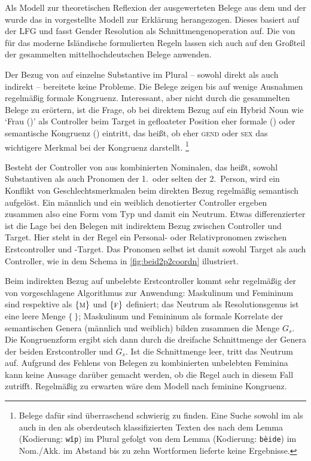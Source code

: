 Als Modell zur theoretischen Reflexion der ausgewerteten Belege aus dem
\CAO{} und der \KC{} wurde das in
\citet{wechsler2009,wechslerzlatic2003} vorgestellte Modell zur Erklärung
herangezogen. Dieses basiert auf der LFG und fasst Gender Resolution als
Schnittmengenoperation auf. Die von
\textcites[578]{wechsler2009}[186]{wechslerzlatic2003} für das moderne
Isländische formulierten Regeln lassen sich auch auf den Großteil der
gesammelten mittelhochdeutschen Belege anwenden.

Der Bezug von  auf einzelne Substantive im Plural -- sowohl direkt
als auch indirekt -- bereitete keine Probleme. Die Belege zeigen bis auf wenige
Ausnahmen regelmäßig formale Kongruenz. Interessant, aber nicht durch die
gesammelten Belege zu erörtern, ist die Frage, ob bei direktem Bezug auf ein
Hybrid Noun wie  `Frau (\NeutF)' als Controller beim Target in
gefloateter Position eher formale () oder semantische Kongruenz
() eintritt, das heißt, ob eher \textsc{gend} oder \textsc{sex} das wichtigere
Merkmal bei der Kongruenz darstellt.%
%
	\footnote{Belege dafür sind überraschend schwierig zu finden. Eine Suche
	sowohl im \CAO{} als auch in den als oberdeutsch klassifizierten
	Texten des \REM{} nach dem Lemma  (Kodierung: \texttt{wîp})
	im Plural gefolgt von dem Lemma  (Kodierung: \texttt{bèide}) im
	Nom./Akk. im Abstand bis zu zehn Wortformen lieferte keine Ergebnisse.}

Besteht der Controller von  aus kombinierten Nominalen, das heißt,
sowohl Substantiven als auch Pronomen der 1.\ oder selten der 2.\ Person, wird
ein Konflikt von Geschlechtsmerkmalen beim direkten Bezug regelmäßig semantisch
aufgelöst. Ein männlich und ein weiblich denotierter Controller ergeben
zusammen also eine Form vom Typ  und damit ein Neutrum. Etwas
differenzierter ist die Lage bei den Belegen mit indirektem Bezug zwischen
Controller und Target. Hier steht in der Regel ein Personal- oder
Relativpronomen zwischen Erstcontroller und -Target. Das Pronomen
selbst ist damit sowohl Target als auch Controller, wie in dem Schema in
\cref{fig:beid2p2coordn} illustriert.

Beim indirekten Bezug auf unbelebte Erstcontroller kommt sehr regelmäßig der
von \textcites[577]{wechsler2009}[184]{wechslerzlatic2003} vorgeschlagene
Algorithmus zur Anwendung: Maskulinum und Femininum sind respektive als
$\{\textsc{m}\}$ und $\{\textsc{f}\}$ definiert; das Neutrum als Resolutionsgenus ist eine
leere Menge $\{\ \}$; Maskulinum und Femininum als formale Korrelate der
semantischen Genera (männlich und weiblich) bilden zusammen die Menge $G_s$.
Die Kongruenzform ergibt sich dann durch die dreifache Schnittmenge der Genera
der beiden Erstcontroller und $G_s$. Ist die Schnittmenge leer, tritt das
Neutrum auf. Aufgrund des Fehlens von Belegen zu kombinierten unbelebten
Feminina kann keine Aussage darüber gemacht werden, ob die Regel auch in diesem
Fall zutrifft. Regelmäßig zu erwarten wäre dem Modell nach feminine Kongruenz.

